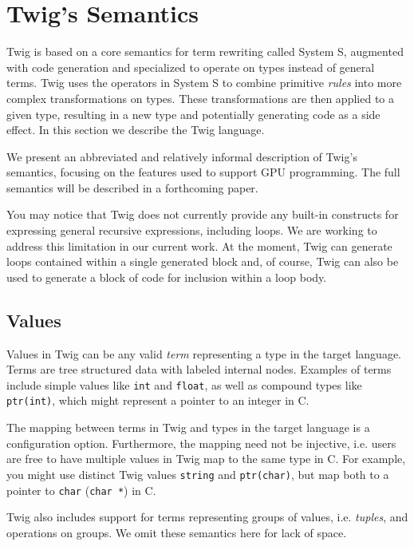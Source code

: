 
\section{Twig's Semantics}
\label{sec:semantics}

Twig is based on a core semantics for term rewriting called System S\cite{system-s}, augmented with code generation and specialized to operate on types instead of general terms. Twig uses the operators in System S to combine primitive \emph{rules} into more complex transformations on types. These transformations are then applied to a given type, resulting in a new type and potentially generating code as a side effect. In this section we describe the Twig language.

We present an abbreviated and relatively informal description of Twig's semantics, focusing on the features used to support GPU programming. The full semantics will be described in a forthcoming paper.

You may notice that Twig does not currently provide any built-in constructs for expressing general recursive expressions, including loops. We are working to address this limitation in our current work. At the moment, Twig can generate loops contained within a single generated block and, of course, Twig can also be used to generate a block of code for inclusion within a loop body.

\subsection{Values}

Values in Twig can be any valid \emph{term} representing a type in the target language. Terms are tree structured data with labeled internal nodes. Examples of terms include simple values like \texttt{int} and \texttt{float}, as well as compound types like \texttt{ptr(int)}, which might represent a pointer to an integer in C.

The mapping between terms in Twig and types in the target language is a configuration option. Furthermore, the mapping need not be injective, i.e. users are free to have multiple values in Twig map to the same type in C. For example, you might use distinct Twig values \texttt{string} and \texttt{ptr(char)}, but map both to a pointer to \texttt{char} (\texttt{char *}) in C.

Twig also includes support for terms representing groups of values, i.e. \emph{tuples}, and operations on groups. We omit these semantics here for lack of space.

